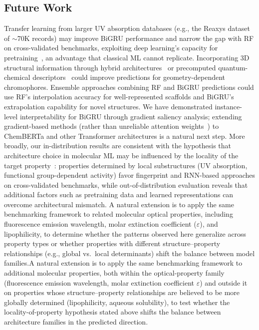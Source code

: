\documentclass[journal=jcisd8,manuscript=article]{achemso}
\newcommand{\added}[1]{{\color{addedblue}#1}}
\newcommand{\removed}[1]{{\color{removedred}#1}}
\begin{document}
\subsection*{Future Work}
Transfer learning from larger UV absorption databases (e.g., the Reaxys dataset of $\sim$70K records) may improve BiGRU performance and narrow the gap with RF on cross-validated benchmarks, exploiting deep learning's capacity for pretraining~\cite{vermeire2021transfer}, an advantage that classical ML cannot replicate.
Incorporating 3D structural information through hybrid architectures~\cite{gilmer2017neural} or precomputed quantum-chemical descriptors~\cite{lupopasini2023excited} could improve predictions for geometry-dependent chromophores.
Ensemble approaches combining RF and BiGRU predictions could use RF's interpolation accuracy for well-represented scaffolds and BiGRU's extrapolation capability for novel structures.
We have demonstrated instance-level interpretability for BiGRU through gradient saliency analysis; extending gradient-based methods (rather than unreliable attention weights~\cite{jain2019attention}) to ChemBERTa and other Transformer architectures is a natural next step.
More broadly, our in-distribution results are consistent with the hypothesis that architecture choice in molecular ML may be influenced by the locality of the target property~\cite{chenMolecularLanguage2023, jiang2023trangru}: properties determined by local substructures (UV absorption, functional group-dependent activity) favor fingerprint and RNN-based approaches on cross-validated benchmarks, while out-of-distribution evaluation reveals that additional factors such as pretraining data and learned representations can overcome architectural mismatch.
\removed{A natural extension is to apply the same benchmarking framework to related molecular optical properties, including fluorescence emission wavelength, molar extinction coefficient ($\varepsilon$), and lipophilicity, to determine whether the patterns observed here generalize across property types or whether properties with different structure--property relationships (e.g., global vs.\ local determinants) shift the balance between model families.}\added{A natural extension is to apply the same benchmarking framework to additional molecular properties, both within the optical-property family (fluorescence emission wavelength, molar extinction coefficient $\varepsilon$) and outside it on properties whose structure--property relationships are believed to be more globally determined (lipophilicity, aqueous solubility), to test whether the locality-of-property hypothesis stated above shifts the balance between architecture families in the predicted direction.}
\end{document}
